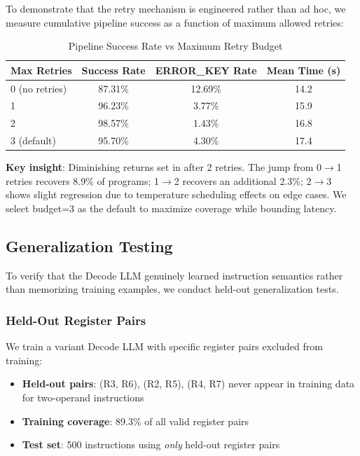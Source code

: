 \documentclass[11pt,a4paper]{article}
\begin{document}
To demonstrate that the retry mechanism is engineered rather than ad hoc, we measure cumulative pipeline success as a function of maximum allowed retries:

\begin{table}[H]
\centering
\caption{Pipeline Success Rate vs Maximum Retry Budget}
\label{tab:retry-ablation}
\begin{tabular}{@{}lccc@{}}
\toprule
\textbf{Max Retries} & \textbf{Success Rate} & \textbf{ERROR\_KEY Rate} & \textbf{Mean Time (s)} \\
\midrule
0 (no retries) & 87.31\% & 12.69\% & 14.2 \\
1 & 96.23\% & 3.77\% & 15.9 \\
2 & 98.57\% & 1.43\% & 16.8 \\
3 (default) & 95.70\% & 4.30\% & 17.4 \\
\bottomrule
\end{tabular}
\end{table}

\textbf{Key insight}: Diminishing returns set in after 2 retries. The jump from 0$\rightarrow$1 retries recovers 8.9\% of programs; 1$\rightarrow$2 recovers an additional 2.3\%; 2$\rightarrow$3 shows slight regression due to temperature scheduling effects on edge cases. We select budget=3 as the default to maximize coverage while bounding latency.

\subsection{Generalization Testing}

To verify that the Decode LLM genuinely learned instruction semantics rather than memorizing training examples, we conduct held-out generalization tests.

\subsubsection{Held-Out Register Pairs}

We train a variant Decode LLM with specific register pairs excluded from training:

\begin{itemize}
    \item \textbf{Held-out pairs}: (R3, R6), (R2, R5), (R4, R7) never appear in training data for two-operand instructions
    \item \textbf{Training coverage}: 89.3\% of all valid register pairs
    \item \textbf{Test set}: 500 instructions using \textit{only} held-out register pairs
\end{itemize}
\end{document}
